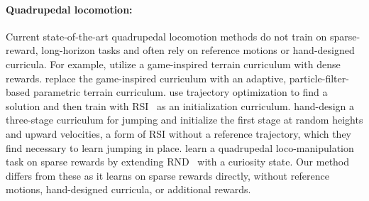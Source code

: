 \paragraph{Quadrupedal locomotion:}
Current state-of-the-art quadrupedal locomotion methods do not train on sparse-reward, long-horizon tasks and often rely on reference motions or hand-designed curricula.
For example, \citet{rudin2022learning} utilize a game-inspired terrain curriculum with dense rewards. \citet{lee2020learning} replace the game-inspired curriculum with an adaptive, particle-filter-based parametric terrain curriculum.
\citet{fuchioka2023opt} use trajectory optimization to find a solution and then train with RSI~\citep{peng2018deepmimic} as an initialization curriculum.
\citet{atanassov2024curriculum} hand-design a three-stage curriculum for jumping and initialize the first stage at random heights and upward velocities, a form of RSI without a reference trajectory, which they find necessary to learn jumping in place.
\citet{schwarke2023curiosity} learn a quadrupedal loco-manipulation task on sparse rewards by extending RND~\citep{burda2018exploration} with a curiosity state.
Our method differs from these as it learns on sparse rewards directly, without reference motions, hand-designed curricula, or additional rewards.
